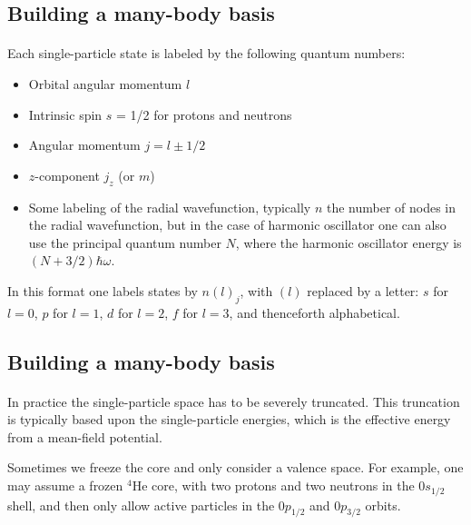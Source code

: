 \documentclass[%
oneside,                 %
final,                   %
10pt]{article}
\begin{document}
\subsection*{Building a many-body basis}

\paragraph{}
Each single-particle state is labeled by the following quantum numbers: 

\begin{itemize}
\item Orbital angular momentum $l$

\item Intrinsic spin $s$ = 1/2 for protons and neutrons

\item Angular momentum $j = l \pm 1/2$

\item $z$-component $j_z$ (or $m$)

\item Some labeling of the radial wavefunction, typically $n$ the number of nodes in  the radial wavefunction, but in the case of harmonic oscillator one can also use the principal quantum number $N$, where the harmonic oscillator energy is $(N+3/2)\hbar \omega$.  
\end{itemize}

\noindent
In this format one labels states by $n(l)_j$, with $(l)$ replaced by a letter:
$s$ for $l=0$, $p$ for $l=1$, $d$ for $l=2$, $f$ for $l=3$, and thenceforth alphabetical.



\subsection*{Building a many-body basis}

\paragraph{}
 In practice the single-particle space has to be severely truncated.  This truncation is 
typically based upon the single-particle energies, which is the effective energy 
from a mean-field potential. 

Sometimes we freeze the core and only consider a valence space. For example, one 
may assume a frozen $^{4}\mbox{He}$ core, with two protons and two neutrons in the $0s_{1/2}$ 
shell, and then only allow active particles in the $0p_{1/2}$ and $0p_{3/2}$ orbits. 
\end{document}
